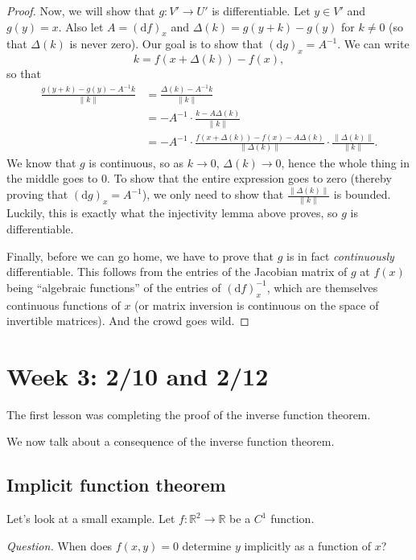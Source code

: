\documentclass[10pt]{scrartcl}
\providecommand{\RR}{\mathbb R}
\providecommand{\inv}{^{-1}}
\begin{document}
\begin{proof}
	Now, we will show that $g\colon V'\to U'$ is differentiable.
	Let $y\in V'$ and $g(y) = x$. Also let $A = (\mathrm df)_x$
	and $\Delta(k) = g(y+k) - g(y)$ for $k\ne 0$
	(so that $\Delta(k)$ is never zero).
	Our goal is to show that $(\mathrm dg)_x = A\inv$.
	We can write
	\[k = f(x + \Delta(k)) - f(x),\]
	so that
	\begin{align*}
		\frac{g(y+k) - g(y) - A\inv k}{\|k\|}
		&=\frac{\Delta(k) - A\inv k}{\|k\|}\\
		&= -A\inv\cdot \frac{k - A\Delta(k)}{\|k\|}\\
		&= -A\inv\cdot\frac{f(x + \Delta(k)) - f(x) - A\Delta(k)}{\|\Delta(k)\|}
		\cdot\frac{\|\Delta(k)\|}{\|k\|}.
	\end{align*}
	We know that $g$ is continuous, so as $k\to 0$, $\Delta(k)\to 0$,
	hence the whole thing in the middle goes to $0$.
	To show that the entire expression goes to zero
	(thereby proving that $(\mathrm dg)_x = A\inv$),
	we only need to show that $\frac{\|\Delta(k)\|}{\|k\|}$ is bounded.
	Luckily, this is exactly what the injectivity lemma above proves,
	so $g$ is differentiable.
	
	Finally, before we can go home, we have to prove that
	$g$ is in fact \emph{continuously} differentiable.
	This follows from the entries of the Jacobian matrix of $g$ at $f(x)$
	being ``algebraic functions'' of the entries of $(\mathrm df)_x\inv$,
	which are themselves continuous functions of $x$
	(or matrix inversion is continuous on the space of invertible matrices).
	And the crowd goes wild.
\end{proof}

\section{Week 3: 2/10 and 2/12}
The first lesson was completing the proof of the inverse function theorem.

We now talk about a consequence of the inverse function theorem.

\subsection{Implicit function theorem}
Let's look at a small example.
Let $f\colon\RR^2\to\RR$ be a $C^1$ function.
\begin{mdframed}
	\emph{Question.} When does $f(x,y) = 0$ determine $y$
	implicitly as a function of $x$?
\end{mdframed}
\end{document}
